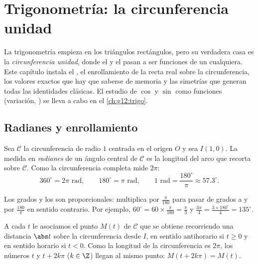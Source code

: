 \chapter{Trigonometría: la circunferencia unidad}\label{ch:g11:trigo}

La trigonometría empieza en los triángulos rectángulos, pero su verdadera
casa es la \emph{circunferencia unidad}, donde el  y el  pasan a
ser funciones de un  cualquiera. Este capítulo instala el
, el enrollamiento de la recta real sobre la circunferencia, los
valores exactos que hay que saberse de memoria y las simetrías que generan
todas las identidades clásicas. El estudio de $\cos$ y $\sin$ como
funciones (variación, ) se lleva a cabo en el
\cref{ch:g12:trigo}.

\section{Radianes y enrollamiento}

\begin{definition}[Radián]\label{def:g11:trigo:radian}
Sea $\mathcal C$ la circunferencia de radio $1$ centrada en el origen $O$
y sea $I(1, 0)$. La medida en \emph{radianes} de un ángulo
central de $\mathcal C$ es la longitud del arco que recorta sobre
$\mathcal C$. Como la circunferencia completa mide $2\pi$:
\[
360^\circ = 2\pi \text{ rad},
\qquad
180^\circ = \pi \text{ rad},
\qquad
1 \text{ rad} = \frac{180^\circ}{\pi} \approx 57.3^\circ .
\]
\end{definition}

\begin{method}[Convertir]\label{met:g11:trigo:convert}
Los grados y los  son proporcionales: multiplica por
$\frac{\pi}{180}$ para pasar de grados a  y por
$\frac{180}{\pi}$ en sentido contrario. Por ejemplo,
$60^\circ = 60 \times \frac{\pi}{180} = \frac{\pi}{3}$ y
$\frac{3\pi}{4} = \frac{3 \times 180^\circ}{4} = 135^\circ$.
\end{method}

\begin{definition}\label{def:g11:trigo:winding}
A cada  $t$ le asociamos el punto $M(t)$ de $\mathcal C$ que se
obtiene recorriendo una distancia $\abs t$ sobre la circunferencia desde
$I$, en sentido antihorario si $t \geq 0$ y en sentido horario si $t < 0$.
Como la longitud de la circunferencia es $2\pi$, los números $t$ y
$t + 2k\pi$ ($k \in \Z$) llegan al mismo punto:
$M(t + 2k\pi) = M(t)$.
\end{definition}

